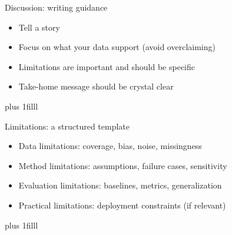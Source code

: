\documentclass[aspectratio=169]{beamer}
\newcommand{\btVFill}{\vskip0pt plus 1filll}
\begin{document}
\begin{frame}{Discussion: writing guidance}
  \begin{itemize}
    \item Tell a story
    \item Focus on what your data support (avoid overclaiming)
    \item Limitations are important and should be specific
    \item Take-home message should be crystal clear
  \end{itemize}
\btVFill\end{frame}

\begin{frame}{Limitations: a structured template}
  \begin{itemize}
    \item Data limitations: coverage, bias, noise, missingness
    \item Method limitations: assumptions, failure cases, sensitivity
    \item Evaluation limitations: baselines, metrics, generalization
    \item Practical limitations: deployment constraints (if relevant)
  \end{itemize}
  \btVFill
\end{frame}
\end{document}
